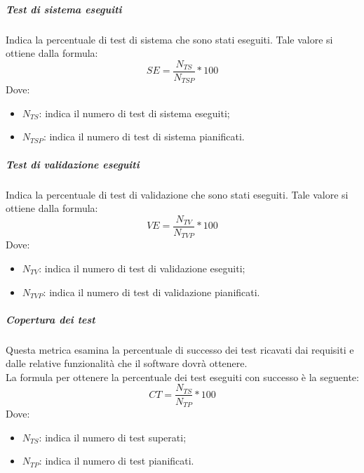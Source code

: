 \documentclass[../NormeDiProgetto_v3.0.0.tex]{subfiles}
\begin{document}
			\subparagraph{Test di sistema eseguiti}
			Indica la percentuale di test di sistema che sono stati eseguiti.
			Tale valore si ottiene dalla formula:
			\begin{equation*}
				SE = \frac{N_{TS}}{N_{TSP}} * 100
			\end{equation*}
			Dove:
			\begin{itemize}
				\item \textbf{$N_{TS}$}: indica il numero di test di sistema eseguiti;
				\item \textbf{$N_{TSP}$}: indica il numero di test di sistema pianificati.
			\end{itemize}
			
			\subparagraph{Test di validazione eseguiti}
			Indica la percentuale di test di validazione che sono stati eseguiti.
			Tale valore si ottiene dalla formula:
			\begin{equation*}
				VE = \frac{N_{TV}}{N_{TVP}} * 100
			\end{equation*}
			Dove:
			\begin{itemize}
				\item \textbf{$N_{TV}$}: indica il numero di test di validazione eseguiti;
				\item \textbf{$N_{TVP}$}: indica il numero di test di validazione pianificati.
			\end{itemize}
			
			\subparagraph{Copertura dei test}
			Questa metrica esamina la percentuale di successo dei test ricavati dai requisiti e dalle relative funzionalità che il software dovrà ottenere.\\La formula per ottenere la percentuale dei test eseguiti con successo è la seguente:
			\begin{equation*}
				CT = \frac{N_{TS}}{N_{TP}} * 100
			\end{equation*}
			Dove:
			\begin{itemize}
				\item \textbf{$N_{TS}$}: indica il numero di test superati;
				\item \textbf{$N_{TP}$}: indica il numero di test pianificati.
			\end{itemize}
\end{document}
